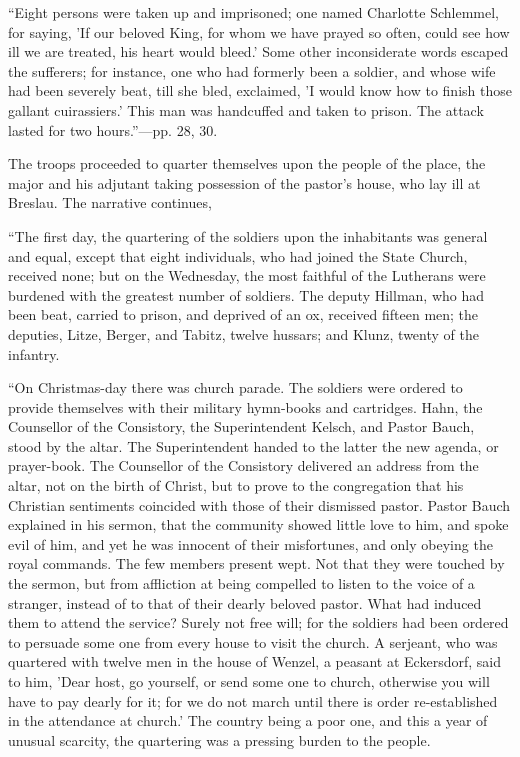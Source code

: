 ``Eight persons were taken up and
imprisoned; one named Charlotte Schlemmel, for saying, 'If our beloved
King, for whom we have prayed so often, could see how ill we are
treated, his heart would bleed.' Some other inconsiderate words escaped
the sufferers; for instance, one who had formerly been a soldier, and
whose wife had been severely beat, till she bled, exclaimed, 'I would
know how to finish those gallant cuirassiers.' This
man was handcuffed and taken to prison. The attack lasted for two hours.''—pp.
28, 30.

The troops proceeded to quarter themselves upon the
people of the place, the major and his adjutant taking possession of the
pastor's house, who lay ill at Breslau. The narrative continues,

``The first day, the quartering of
the soldiers upon the inhabitants was general and equal, except that
eight individuals, who had joined the State Church, received none; but
on the Wednesday, the most faithful of the Lutherans were burdened with
the greatest number of soldiers. The deputy Hillman, who had been beat,
carried to prison, and deprived of an ox, received fifteen men; the
deputies, Litze, Berger, and Tabitz, twelve hussars; and Klunz, twenty
of the infantry.

``On Christmas-day there was church
parade. The soldiers were ordered to provide themselves with their
military hymn-books and cartridges. Hahn, the Counsellor of the
Consistory, the Superintendent Kelsch, and Pastor Bauch, stood by the
altar. The Superintendent handed to the latter the new agenda, or
prayer-book. The Counsellor of the Consistory delivered an address from
the altar, not on the birth of Christ, but to prove to the congregation
that his Christian sentiments coincided with those of their dismissed
pastor. Pastor Bauch explained in his sermon, that the community showed
little love to him, and spoke evil of him, and yet he was innocent of
their misfortunes, and only obeying the royal commands. The few members
present wept. Not that they were touched by the sermon, but from
affliction at being compelled to listen to the voice of a stranger,
instead of to that of their dearly beloved pastor. What had induced them
to attend the service? Surely not free will; for the soldiers had been
ordered to persuade some one from every house to visit the church. A
serjeant, who was quartered with twelve men in the house of Wenzel, a
peasant at Eckersdorf, said to him, 'Dear host, go yourself, or send
some one to church, otherwise you will have to pay dearly for it; for we
do not march until there is order re-established in the attendance at
church.' The country being a poor one, and this a year of unusual
scarcity, the quartering was a pressing burden to the people.


